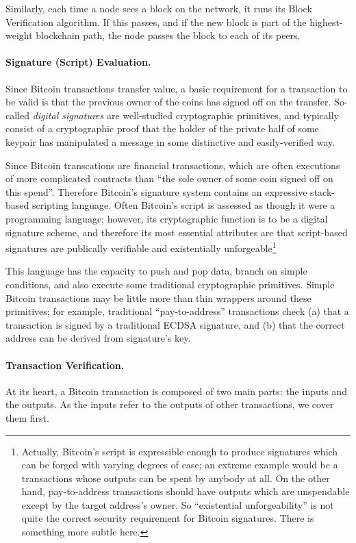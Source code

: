 \documentclass[letterpaper]{article}
\begin{document}
Similarly, each time a node sees a block on the network, it runs its
Block Verification algorithm. If this passes, and if the new block is
part of the highest-weight blockchain path, the node passes the block
to each of its peers.

\paragraph{Signature (Script) Evaluation.} Since Bitcoin transactions
transfer value, a basic requirement for a transaction to be valid is
that the previous owner of the coins has signed off on the transfer.
So-called \emph{digital signatures} are well-studied cryptographic
primitives, and typically consist of a cryptographic proof that the
holder of the private half of some keypair has manipulated a message
in some distinctive and easily-verified way.

Since Bitcoin transcations are financial transactions, which are often
executions of more complicated contracts than ``the sole owner of some
coin signed off on this spend''. Therefore Bitcoin's signature system
contains an expressive stack-based scripting language. Often Bitcoin's
script is assessed as though it were a programming language; however,
its cryptographic function is to be a digital signature scheme, and
therefore its most essential attributes are that script-based signatures
are publically verifiable and existentially unforgeable\footnote{Actually,
Bitcoin's script is expressible enough to produce signatures which can
be forged with varying degrees of ease; an extreme example would be a
transactions whose outputs can be spent by anybody at all. On the other
hand, pay-to-address transactions should have outputs which are unspendable
except by the target address's owner.  So ``existential unforgeability''
is not quite the correct security requirement for Bitcoin signatures.
There is something more subtle here.}

This language has the capacity to push and pop data, branch on simple
conditions, and also execute some traditional cryptographic primitives.
Simple Bitcoin transactions may be little more than thin wrappers around
these primitives; for example, traditional ``pay-to-address'' transactions
check (a) that a transaction is signed by a traditional ECDSA signature,
and (b) that the correct address can be derived from signature's key.

\paragraph{Transaction Verification.} At its heart, a Bitcoin transaction
is composed of two main parts: the inputs and the outputs. As the inputs
refer to the outputs of other transactions, we cover them first.
\end{document}
